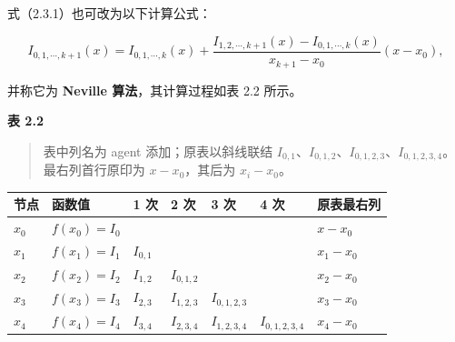 式（2.3.1）也可改为以下计算公式：

\[
I_{0,1,\cdots,k+1}(x)
=I_{0,1,\cdots,k}(x)
+\frac{I_{1,2,\cdots,k+1}(x)-I_{0,1,\cdots,k}(x)}
{x_{k+1}-x_0}(x-x_0),
\tag{2.3.2}
\]

并称它为 \textbf{Neville 算法}，其计算过程如表 2.2 所示。

\textbf{表 2.2}

\begin{quote}
表中列名为 agent 添加；原表以斜线联结 \(I_{0,1}\)、\(I_{0,1,2}\)、\(I_{0,1,2,3}\)、\(I_{0,1,2,3,4}\)。最右列首行原印为 \(x-x_0\)，其后为 \(x_i-x_0\)。
\end{quote}

{\def\LTcaptype{none} %
\begin{longtable}[]{@{}
  >{\raggedright\arraybackslash}p{}
  >{\raggedright\arraybackslash}p{}
  >{\raggedright\arraybackslash}p{}
  >{\raggedright\arraybackslash}p{}
  >{\raggedright\arraybackslash}p{}
  >{\raggedright\arraybackslash}p{}
  >{\raggedright\arraybackslash}p{}@{}}
\toprule\noalign{}
\begin{minipage}[b]{\linewidth}\raggedright
节点
\end{minipage} & \begin{minipage}[b]{\linewidth}\raggedright
函数值
\end{minipage} & \begin{minipage}[b]{\linewidth}\raggedright
1 次
\end{minipage} & \begin{minipage}[b]{\linewidth}\raggedright
2 次
\end{minipage} & \begin{minipage}[b]{\linewidth}\raggedright
3 次
\end{minipage} & \begin{minipage}[b]{\linewidth}\raggedright
4 次
\end{minipage} & \begin{minipage}[b]{\linewidth}\raggedright
原表最右列
\end{minipage} \\
\midrule\noalign{}
\endhead
\bottomrule\noalign{}
\endlastfoot
\(x_0\) & \(f(x_0)=I_0\) & & & & & \(x-x_0\) \\
\(x_1\) & \(f(x_1)=I_1\) & \(I_{0,1}\) & & & & \(x_1-x_0\) \\
\(x_2\) & \(f(x_2)=I_2\) & \(I_{1,2}\) & \(I_{0,1,2}\) & & & \(x_2-x_0\) \\
\(x_3\) & \(f(x_3)=I_3\) & \(I_{2,3}\) & \(I_{1,2,3}\) & \(I_{0,1,2,3}\) & & \(x_3-x_0\) \\
\(x_4\) & \(f(x_4)=I_4\) & \(I_{3,4}\) & \(I_{2,3,4}\) & \(I_{1,2,3,4}\) & \(I_{0,1,2,3,4}\) & \(x_4-x_0\) \\
\end{longtable}
}

